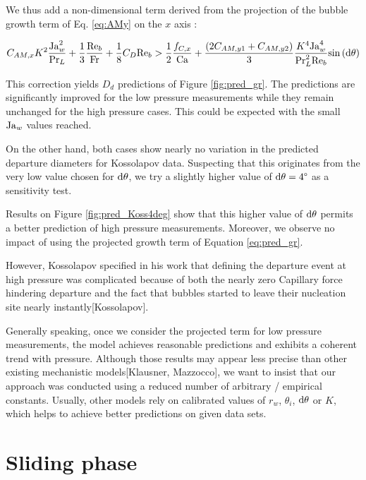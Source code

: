 We thus add a non-dimensional term derived from the projection of the bubble growth term of Eq. \ref{eq:AMy} on the $x$ axis :

\begin{equation}
C_{AM,x}K^{2} \frac{\mathrm{Ja}_{w}^{2}}{\mathrm{Pr}_{L}} + \frac{1}{3}\frac{\mathrm{Re}_{b}}{\mathrm{Fr}} + \frac{1}{8}C_{D}\mathrm{Re}_{b} > \frac{1}{2} \frac{f_{C,x}}{\mathrm{Ca}}  + \frac{\left( 2C_{AM,y1}+C_{AM,y2} \right)}{3}\frac{K^{4}\mathrm{Ja}_{w}^{4}}{\mathrm{Pr}_{L}^{2} \mathrm{Re}_{b}}\mathrm{sin}\left( \mathrm{d}\theta \right)
\label{eq:pred_gr}
\end{equation}

This correction yields $D_{d}$ predictions of Figure \ref{fig:pred_gr}. The predictions are significantly improved for the low pressure measurements while they remain unchanged for the high pressure cases. This could be expected with the small $\mathrm{Ja}_{w}$ values reached.


On the other hand, both cases show nearly no variation in the predicted departure diameters for Kossolapov data. Suspecting that this originates from the very low value chosen for $\mathrm{d}\theta$, we try a slightly higher value of $\mathrm{d}\theta = 4\degree$ as a sensitivity test. 

Results on Figure \ref{fig:pred_Koss4deg} show that this higher value of $\mathrm{d}\theta$ permits a better prediction of high pressure measurements. Moreover, we observe no impact of using the projected growth term of Equation \ref{eq:pred_gr}.

However, Kossolapov specified in his work that defining the departure event at high pressure was complicated because of both the nearly zero Capillary force hindering departure and the fact that bubbles started to leave their nucleation site nearly instantly[Kossolapov].


Generally speaking, once we consider the projected term for low pressure measurements, the model achieves reasonable predictions and exhibits a coherent trend with pressure. Although those results may appear less precise than other existing mechanistic models[Klausner, Mazzocco], we want to insist that our approach was conducted using a reduced number of arbitrary / empirical constants. Usually, other models rely on calibrated values of $r_{w}$, $\theta_{i}$, $\mathrm{d}\theta$ or $K$, which helps to achieve better predictions on given data sets.



\section{Sliding phase}\label{sliding}


